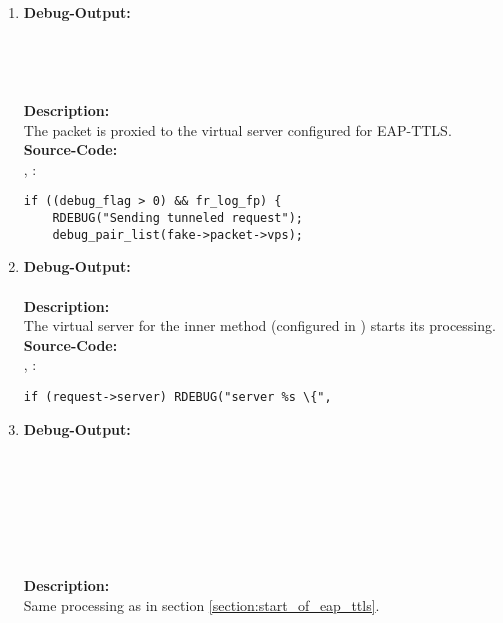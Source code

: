 \begin{enumerate}
\newpage

\item \textbf{Debug-Output:}\\
\\
\\
\\
\\
\newline
\textbf{Description:}\\
The packet is proxied to the virtual server configured for EAP-TTLS.\\
\newline
\textbf{Source-Code:}\\
, :
\begin{lstlisting}
if ((debug_flag > 0) && fr_log_fp) {
	RDEBUG("Sending tunneled request");
	debug_pair_list(fake->packet->vps);
\end{lstlisting}

\item \textbf{Debug-Output:}\\
\\
\newline
\textbf{Description:}\\
The virtual server for the inner method (configured in ) starts its processing.\\
\newline
\textbf{Source-Code:}\\
, :
\begin{lstlisting}
if (request->server) RDEBUG("server %s \{",
\end{lstlisting}

\item \textbf{Debug-Output:}\\
\\
\\
\\
\\
\\
\\
\\
\newline
\textbf{Description:}\\
Same processing as in section \ref{section:start_of_eap_ttls}.


\end{enumerate}
